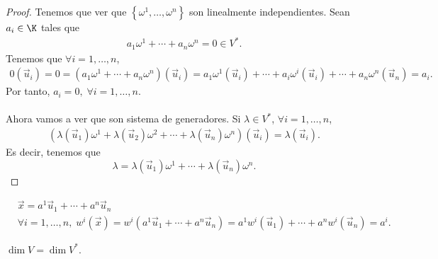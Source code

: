 \begin{proof}
	Tenemos que ver que $\displaystyle \left\{ \omega^{1}, \ldots, \omega^{n}\right\}  $ son linealmente independientes. Sean $\displaystyle a_{i} \in \K $ tales que
\[
\begin{split}
a_{1}\omega^{1} + \cdots + a_{n}\omega^{n} = 0 \in V^{*} .
\end{split}
\]
Tenemos que $\displaystyle \forall i = 1, \ldots, n $,
\[
\begin{split}
0\left(\vec{u}_{i}\right) = 0 = \left(a_{1}\omega^{1} + \cdots + a_{n}\omega^{n}\right)\left(\vec{u}_{i}\right) = a_{1}\omega^{1}\left(\vec{u}_{i}\right)+ \cdots + a_{i}\omega^{i}\left(\vec{u}_{i}\right) + \cdots + a_{n}\omega^{n}\left(\vec{u}_{n}\right) = a_{i} .
\end{split}
\]
Por tanto, $\displaystyle a_{i} = 0, \; \forall i = 1, \ldots , n $. \\ \\
Ahora vamos a ver que son sistema de generadores. Si $\displaystyle \lambda \in V^{*} $, $\displaystyle \forall i = 1, \ldots, n $, 
\[
\begin{split}
	\left(\lambda\left(\vec{u}_{1}\right)\omega^{1} + \lambda\left(\vec{u}_{2}\right)\omega^{2}+ \cdots + \lambda\left(\vec{u}_{n}\right)\omega^{n}\right)\left(\vec{u}_{i}\right) = \lambda\left(\vec{u}_{i}\right) .
\end{split}
\]
Es decir, tenemos que 
\[\lambda = \lambda\left(\vec{u}_{1}\right)\omega^{1} + \cdots + \lambda\left(\vec{u}_{n}\right)\omega^{n} .\]
\end{proof}

\begin{observation}
\normalfont 
\[
\begin{split}
& \vec{x} = a^{1} \vec{u}_{1} + \cdots + a^{n}\vec{u}_{n} \\
& \forall i = 1, \ldots, n, \; w^{i}\left(\vec{x}\right) = w^{i}\left(a^{1}\vec{u}_{1} + \cdots + a^{n}\vec{u}_{n}\right) = a^{1}w^{i}\left(\vec{u}_{1}\right) + \cdots + a^{n}w^{i}\left(\vec{u}_{n}\right) = a^{i}.
\end{split}
\]
\end{observation}

\begin{fcolorary}[]
\normalfont $\displaystyle \dim V = \dim V^{*} $.
\end{fcolorary}

